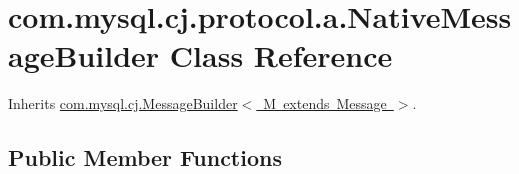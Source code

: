\hypertarget{classcom_1_1mysql_1_1cj_1_1protocol_1_1a_1_1_native_message_builder}{}\section{com.\+mysql.\+cj.\+protocol.\+a.\+Native\+Message\+Builder Class Reference}
\label{classcom_1_1mysql_1_1cj_1_1protocol_1_1a_1_1_native_message_builder}


Inherits \mbox{\hyperlink{interfacecom_1_1mysql_1_1cj_1_1_message_builder}{com.\+mysql.\+cj.\+Message\+Builder$<$ M extends Message $>$}}.

\subsection*{Public Member Functions}
